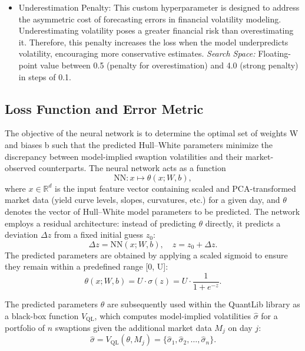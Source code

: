 {\begin{itemize}
	\item Underestimation Penalty: This custom hyperparameter is designed to address the asymmetric cost of forecasting errors in financial volatility modeling. Underestimating volatility poses a greater financial risk than overestimating it. Therefore, this penalty increases the loss when the model underpredicts volatility, encouraging more conservative estimates. \newline
	      \textit{Search Space:} Floating-point value between 0.5 (penalty for overestimation) and 4.0 (strong penalty) in steps of 0.1.
\end{itemize}

\subsection{Loss Function and Error Metric}
\label{subsec:loss_function_and_error_metric}
The objective of the neural network is to determine the optimal set of weights W and biases b such that the predicted Hull--White parameters minimize the discrepancy between model-implied swaption volatilities and their market-observed counterparts. The neural network acts as a function
\begin{equation}
	\text{NN} : x \mapsto \theta(x; W, b),
\end{equation}
where $x \in \mathbb{R}^d$ is the input feature vector containing scaled and PCA-transformed market data (yield curve levels, slopes, curvatures, etc.) for a given day, and $\theta$ denotes the vector of Hull--White model parameters to be predicted. The network employs a residual architecture: instead of predicting $\theta$ directly, it predicts a deviation $\Delta z$ from a fixed initial guess $z_0$:
\begin{equation}
	\Delta z = \text{NN}(x; W, b), \quad
	z = z_0 + \Delta z.
\end{equation}
The predicted parameters are obtained by applying a scaled sigmoid to ensure they remain within a predefined range [0, U]:
\begin{equation}
	\theta(x; W, b) = U \cdot \sigma(z) = U \cdot \frac{1}{1 + e^{-z}}.
\end{equation}

The predicted parameters $\theta$ are subsequently used within the QuantLib library as a black-box function $V_{\text{QL}}$, which computes model-implied volatilities $\hat{\sigma}$ for a portfolio of $n$ swaptions given the additional market data $M_j$ on day $j$:
\begin{equation}
	\hat{\sigma} = V_{\text{QL}}(\theta, M_j) = \{\hat{\sigma}_1, \hat{\sigma}_2, \dots, \hat{\sigma}_n\}.
\end{equation}

}

